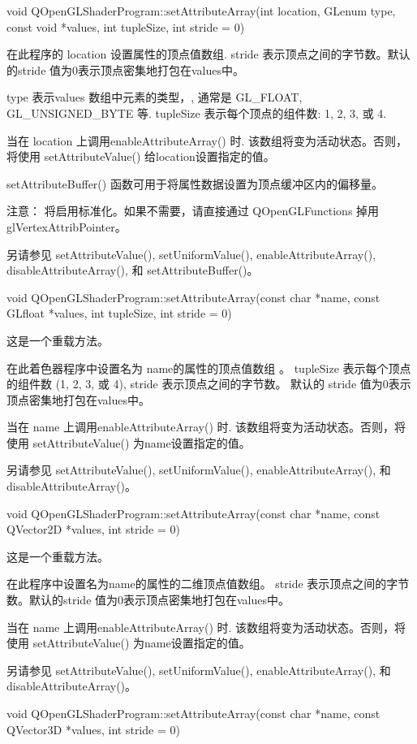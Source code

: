 void QOpenGLShaderProgram::setAttributeArray(int location, GLenum type, const void *values, int tupleSize, int stride = 0)

在此程序的 location 设置属性的顶点值数组. stride 表示顶点之间的字节数。默认的stride 值为0表示顶点密集地打包在values中。

type 表示values 数组中元素的类型，, 通常是 GL\_FLOAT, GL\_UNSIGNED\_BYTE 等. tupleSize 表示每个顶点的组件数: 1, 2, 3, 或 4.

当在 location 上调用enableAttributeArray() 时. 该数组将变为活动状态。否则，将使用 setAttributeValue() 给location设置指定的值。

setAttributeBuffer() 函数可用于将属性数据设置为顶点缓冲区内的偏移量。

注意： 将启用标准化。如果不需要，请直接通过 QOpenGLFunctions 掉用glVertexAttribPointer。

另请参见 setAttributeValue(), setUniformValue(), enableAttributeArray(), disableAttributeArray(), 和 setAttributeBuffer()。

void QOpenGLShaderProgram::setAttributeArray(const char *name, const GLfloat *values, int tupleSize, int stride = 0)

这是一个重载方法。

在此着色器程序中设置名为 name的属性的顶点值数组 。 tupleSize 表示每个顶点的组件数 (1, 2, 3, 或 4), stride 表示顶点之间的字节数。 默认的 stride 值为0表示顶点密集地打包在values中。

当在 name 上调用enableAttributeArray() 时. 该数组将变为活动状态。否则，将使用 setAttributeValue() 为name设置指定的值。

另请参见 setAttributeValue(), setUniformValue(), enableAttributeArray(), 和 disableAttributeArray()。

void QOpenGLShaderProgram::setAttributeArray(const char *name, const QVector2D *values, int stride = 0)

这是一个重载方法。

在此程序中设置名为name的属性的二维顶点值数组。 stride 表示顶点之间的字节数。默认的stride 值为0表示顶点密集地打包在values中。

当在 name 上调用enableAttributeArray() 时. 该数组将变为活动状态。否则，将使用 setAttributeValue() 为name设置指定的值。

另请参见 setAttributeValue(), setUniformValue(), enableAttributeArray(), 和 disableAttributeArray()。

void QOpenGLShaderProgram::setAttributeArray(const char *name, const QVector3D *values, int stride = 0)

